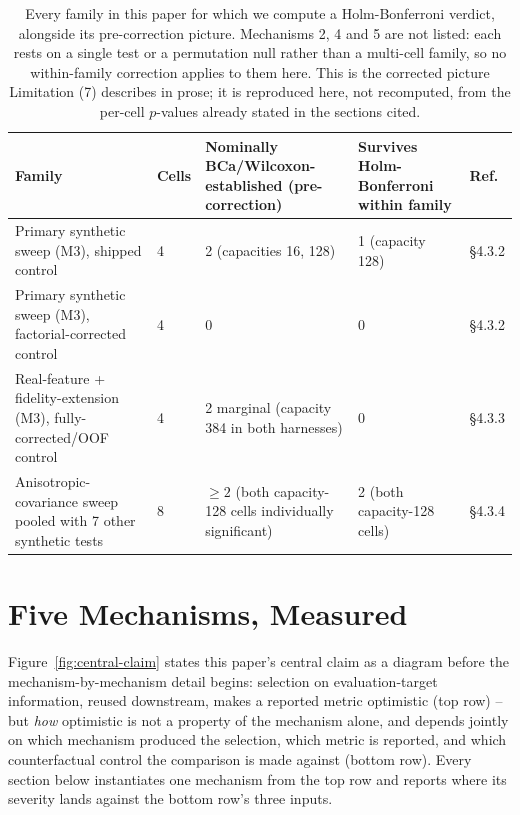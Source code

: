 \documentclass[10pt]{article} %
\begin{document}
\begin{table}[!ht]
\centering
\small
\begin{tabular}{@{}p{}p{}p{}p{}p{}@{}}
\toprule
Family & Cells & Nominally BCa/Wilcoxon-established (pre-correction) & Survives Holm-Bonferroni within family & Ref. \\
\midrule
Primary synthetic sweep (M3), shipped control & 4 & 2 (capacities 16, 128) & 1 (capacity 128) & §4.3.2 \\
Primary synthetic sweep (M3), factorial-corrected control & 4 & 0 & 0 & §4.3.2 \\
Real-feature + fidelity-extension (M3), fully-corrected/OOF control & 4 & 2 marginal (capacity 384 in both harnesses) & 0 & §4.3.3 \\
Anisotropic-covariance sweep pooled with 7 other synthetic tests & 8 & $\geq2$ (both capacity-128 cells individually significant) & 2 (both capacity-128 cells) & §4.3.4 \\
\bottomrule
\end{tabular}
\caption{Every family in this paper for which we compute a Holm-Bonferroni
verdict, alongside its pre-correction picture. Mechanisms 2, 4 and 5 are not
listed: each rests on a single test or a permutation null rather than a
multi-cell family, so no within-family correction applies to them here. This
is the corrected picture Limitation (7) describes in prose; it is reproduced
here, not recomputed, from the per-cell $p$-values already stated in the
sections cited.}
\label{tab:holm-summary}
\end{table}

\section{Five Mechanisms, Measured}

Figure~\ref{fig:central-claim} states this paper's central claim as a
diagram before the mechanism-by-mechanism detail begins: selection on
evaluation-target information, reused downstream, makes a reported metric
optimistic (top row) -- but \emph{how} optimistic is not a property of the
mechanism alone, and depends jointly on which mechanism produced the
selection, which metric is reported, and which counterfactual control the
comparison is made against (bottom row). Every section below instantiates
one mechanism from the top row and reports where its severity lands
against the bottom row's three inputs.
\end{document}
